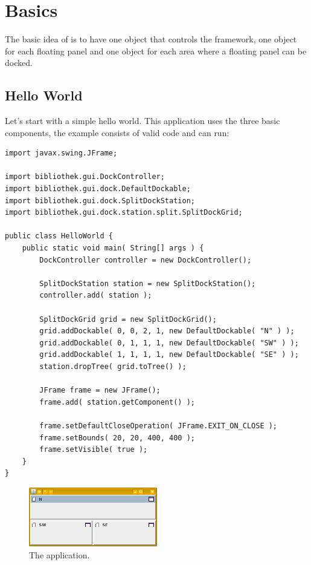 \section{Basics}
The basic idea of  is to have one object that controls the framework, one object for each floating panel and one object for each area where a floating panel can be docked.


\subsection{Hello World}
Let's start with a simple hello world. This application uses the three basic components, the example consists of valid code and can run:
\begin{lstlisting}
import javax.swing.JFrame;

import bibliothek.gui.DockController;
import bibliothek.gui.dock.DefaultDockable;
import bibliothek.gui.dock.SplitDockStation;
import bibliothek.gui.dock.station.split.SplitDockGrid;

public class HelloWorld {
	public static void main( String[] args ) {
		DockController controller = new DockController();

		SplitDockStation station = new SplitDockStation();
		controller.add( station );
	
		SplitDockGrid grid = new SplitDockGrid();
		grid.addDockable( 0, 0, 2, 1, new DefaultDockable( "N" ) );
		grid.addDockable( 0, 1, 1, 1, new DefaultDockable( "SW" ) );
		grid.addDockable( 1, 1, 1, 1, new DefaultDockable( "SE" ) );
		station.dropTree( grid.toTree() );
	
		JFrame frame = new JFrame();
		frame.add( station.getComponent() );
	
		frame.setDefaultCloseOperation( JFrame.EXIT_ON_CLOSE );
		frame.setBounds( 20, 20, 400, 400 );
		frame.setVisible( true );
	}
}
\end{lstlisting}

\begin{figure}[h!]
  \centering
    \includegraphics[width=0.5\textwidth]{basics/HelloWorld}
  \caption{The  application.}
\end{figure}


